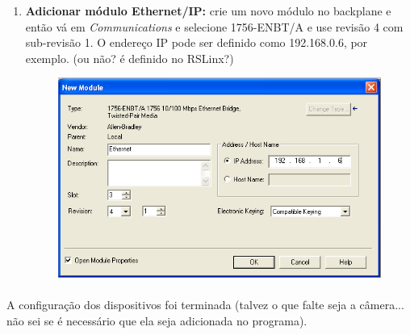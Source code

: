 \documentclass[a4paper,11pt]{scrartcl} %
\numberwithin{equation}{section} %
\numberwithin{figure}{section} %
\numberwithin{table}{section} %
\begin{document}
\begin{enumerate}
\begin{minipage}[!ht]{\linewidth}
\begin{minipage}{0.45\linewidth}
\begin{figure}[H]
          \end{figure}
      \end{minipage}
  \end{minipage}
  
  \item \textbf{Adicionar módulo Ethernet/IP: } crie um novo módulo no backplane e então vá em \textit{Communications} e selecione 1756-ENBT/A e use revisão 4 com sub-revisão 1. O endereço IP pode ser definido como 192.168.0.6, por exemplo. (ou não? é definido no RSLinx?)
  
       \begin{figure}[H]
       \centering
              \includegraphics[width=0.5\linewidth]{figures/software/step10}
          \end{figure}
\end{enumerate}

\paragraph{} A configuração dos dispositivos foi terminada (talvez o que falte seja a câmera... não sei se é necessário que ela seja adicionada no programa).
\end{document}

